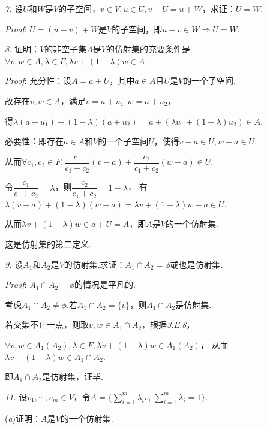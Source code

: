 \hspace*{\fill}

\textit{7.}
设\(U\)和\(W\)是\(V\)的子空间，\(v \in V,u \in U,v+U=u+W\)，求证：\(U=W\).

\textit{Proof}:
\(U=(u-v)+W\)是\(V\)的子空间，即\(u-v \in W \Rightarrow U=W\).

\hspace*{\fill}

\textit{8.}
证明：\(V\)的非空子集\(A\)是\(V\)的仿射集的充要条件是\(\forall v,w \in A,\lambda \in F,\lambda v+(1- \lambda)w \in A\).

\textit{Proof}:
充分性：设\(A=a+U\)，其中\(a\in A\)且\(U\)是\(V\)的一个子空间.

故存在\(v,w \in A\)，满足\(v=a+u_1,w=a+u_2\)，

得\(\lambda(a+u_1)+(1-\lambda)(a+u_2)=a+(\lambda u_1+(1-\lambda)u_2) \in A\).

必要性：即存在\(a \in A\)和\(V\)的一个子空间\(U\)，使得\(v-a \in U,w-a \in U\).

从而\(\forall c_1,c_2 \in F,\dfrac{c_1}{c_1+c_2}(v-a)+\dfrac{c_2}{c_1+c_2}(w-a) \in U\).

令\(\dfrac{c_1}{c_1+c_2}=\lambda\)，则\(\dfrac{c_2}{c_1+c_2}=1-\lambda\)，
有\(\lambda (v-a)+(1- \lambda)(w-a)=\lambda v+(1- \lambda)w-a \in U\).

从而\(\lambda v+(1- \lambda)w \in a+U=A\)，即\(A\)是\(V\)的一个仿射集.

这是仿射集的第二定义.

\newpage

\textit{9.}
设\(A_1\)和\(A_2\)是\(V\)的仿射集.求证：\(A_1 \cap A_2=\phi\)或也是仿射集.

\textit{Proof}:
\(A_1 \cap A_2=\phi\)的情况是平凡的.

考虑\(A_1 \cap A_2 \ne \phi\).若\(A_1 \cap A_2=\{v\}\)，则\(A_1 \cap A_2\)是仿射集.

若交集不止一点，则取\(v,w \in A_1 \cap A_2\)，根据\textit{3.E.8}，

\(\forall v,w \in A_1(A_2),\lambda \in F,\lambda v+(1- \lambda)w \in A_1(A_2)\)，
从而\(\lambda v+(1- \lambda)w \in A_1 \cap A_2\).

即\(A_1 \cap A_2\)是仿射集，证毕.

\hspace*{\fill}

\textit{11.}
设\(v_1,\cdots,v_m \in V\)，令\(A=\{\sum_{i=1}^m \lambda_i v_i|\sum_{i=1}^m \lambda_i=1\}\).

(\textit{a})证明：\(A\)是\(V\)的一个仿射集.

